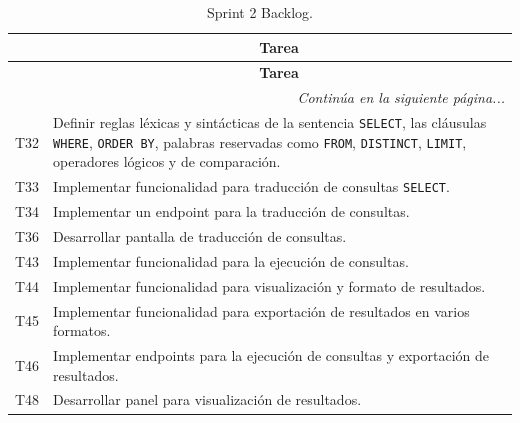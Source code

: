 \begin{longtable}[c]{|c|m{}|}
    \caption{Sprint 2 Backlog.}
    \label{tab:sprintBacklog2} \\
    
    \hline
    \rowcolor{gray!50}
    \multicolumn{1}{|c|}{\textbf{Código}} & \multicolumn{1}{c|}{\textbf{Tarea}} \\
    \hline
    \endfirsthead

    \hline
    \rowcolor{gray!50}
    \multicolumn{1}{|c|}{\textbf{Código}} & \multicolumn{1}{c|}{\textbf{Tarea}} \\
    \hline
    \endhead

    \multicolumn{2}{r}{\textit{Continúa en la siguiente página...}} \\
    \endfoot
    
    \endlastfoot

    T32 & Definir reglas léxicas y sintácticas de la sentencia \texttt{SELECT}, las cláusulas \texttt{WHERE}, \texttt{ORDER BY}, palabras reservadas como \texttt{FROM}, \texttt{DISTINCT}, \texttt{LIMIT}, operadores lógicos y de comparación. \\
    \hline
    T33 & Implementar funcionalidad para traducción de consultas \texttt{SELECT}. \\
    \hline
    T34 & Implementar un endpoint para la traducción de consultas. \\
    \hline
    T36 & Desarrollar pantalla de traducción de consultas. \\
    \hline
    T43 & Implementar funcionalidad para la ejecución de consultas. \\
    \hline
    T44 & Implementar funcionalidad para visualización y formato de resultados. \\
    \hline
    T45 & Implementar funcionalidad para exportación de resultados en varios formatos. \\
    \hline
    T46 & Implementar endpoints para la ejecución de consultas y exportación de resultados. \\
    \hline
    T48 & Desarrollar panel para visualización de resultados. \\
    \hline
\end{longtable}